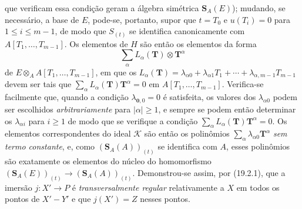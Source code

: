 
que verificam essa condição geram a álgebra simétrica $\mathbf S_A(E)$); mudando, se necessário, a base de $E$, pode-se, portanto, supor que $t=T_0$ e $u(T_i)=0$ para $1\leq i\leq m-1$, de modo que $S_{(t)}$ se identifica canonicamente com $A[T_1,\ldots,T_{m-1}]$. Os elementos de $H$ são então os elementos da forma
\[
  \sum_\alpha L_\alpha(\mathbf T)\otimes\mathbf T^\alpha
\]
de $E\otimes_A A[T_1,\ldots,T_{m-1}]$, em que os $L_\alpha(\mathbf T)=\lambda_{\alpha0}+\lambda_{\alpha1}T_1+\cdots+\lambda_{\alpha,m-1}T_{m-1}$ devem ser tais que $\sum_\alpha L_\alpha(\mathbf T)\mathbf T^\alpha=0$ em $A[T_1,\ldots,T_{m-1}]$. Verifica-se facilmente que, quando a condição $\lambda_{\mathbf0,0}=0$ é satisfeita, os valores dos $\lambda_{\alpha0}$ podem ser escolhidos \emph{arbitrariamente} para $|\alpha|\geq1$, e sempre se podem então determinar os $\lambda_{\alpha i}$ para $i\geq1$ de modo que se verifique a condição $\sum_\alpha L_\alpha(\mathbf T)\mathbf T^\alpha=0$. Os elementos correspondentes do ideal $\mathscr K$ são então os polinômios $\sum_\alpha\lambda_{\alpha0}\mathbf T^\alpha$ \emph{sem termo constante}, e, como $(\mathbf S_A(A))_{(t)}$ se identifica com $A$, esses polinômios são exatamente os elementos do núcleo do homomorfismo $(\mathbf S_A(E))_{(t)}\to(\mathbf S_A(A))_{(t)}$. Demonstrou-se assim, por (19.2.1), que a imersão $j:X'\to P$ é \emph{transversalmente regular} relativamente a $X$ em todos os pontos de $X'-Y'$ e que $j(X')=Z$ nesses pontos.

